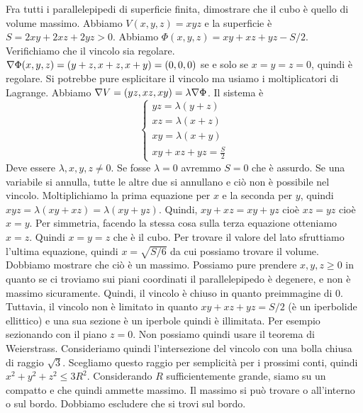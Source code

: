 \documentclass[a4paper]{article}
\begin{document}
\begin{snippetexercise}{}
    Fra tutti i parallelepipedi di superficie finita, dimostrare che il cubo è quello di volume massimo.
    Abbiamo \(V(x,y,z) = xyz\) e la superficie è \(S = 2xy +2xz + 2yz > 0\).
    Abbiamo \(\Phi(x,y,z) = xy + xz + yz - S/2\).
    Verifichiamo che il vincolo sia regolare.
    \(\nabla \Phi(x,y,z) = (y + z, x + z, x + y) = (0,0,0)\)
    se e solo se \(x=y=z=0\), quindi è regolare. Si potrebbe pure esplicitare il vincolo
    ma usiamo i moltiplicatori di Lagrange.
    Abbiamo \(\nabla V = (yz, xz, xy) = \lambda \nabla \Phi\). Il sistema è
    \[
        \begin{cases}
            yz = \lambda (y + z) \\
            xz = \lambda (x + z) \\
            xy = \lambda (x + y) \\
            xy + xz + yz = \frac{S}{2}
        \end{cases}
    \]
    Deve essere \(\lambda,x,y,z \neq 0\). Se fosse \(\lambda =0\) avremmo \(S=0\) che è assurdo.
    Se una variabile si annulla, tutte le altre due si annullano e ciò non è possibile nel vincolo.
    Moltiplichiamo la prima equazione per \(x\) e la seconda per \(y\),
    quindi \(xyz = \lambda(xy + xz) = \lambda(xy + yz)\).
    Quindi, \(xy + xz = xy + yz\) cioè \(xz = yz\) cioè \(x=y\).
    Per simmetria, facendo la stessa cosa sulla terza equazione otteniamo \(x=z\).
    Quindi \(x=y=z\) che è il cubo.
    Per trovare il valore del lato sfruttiamo l'ultima equazione,
    quindi \(x = \sqrt{S/6}\) da cui possiamo trovare il volume.
    Dobbiamo mostrare che ciò è un massimo.
    Possiamo pure prendere \(x,y,z \geq 0\) in quanto se ci troviamo sui piani
    coordinati il parallelepipedo è degenere, e non è massimo sicuramente.
    Quindi, il vincolo è chiuso in quanto preimmagine di \(0\).
    Tuttavia, il vincolo non è limitato in quanto \(xy + xz + yz = S/2\)
    (è un iperbolide ellittico) e una sua sezione è un iperbole quindi è illimitata.
    Per esempio sezionando con il piano \(z=0\).
    Non possiamo quindi usare il teorema di Weierstrass.
    Consideriamo quindi l'intersezione del vincolo con una bolla chiusa
    di raggio \(\sqrt{3}\). Scegliamo questo raggio per semplicità per i prossimi conti,
    quindi \(x^2 + y^2 + z^2 \leq 3R^2\).
    Considerando \(R\) sufficientemente grande, siamo su un compatto
    e che quindi ammette massimo. Il massimo si può trovare o all'interno
    o sul bordo. Dobbiamo escludere che si trovi sul bordo.

\end{snippetexercise}
\end{document}
